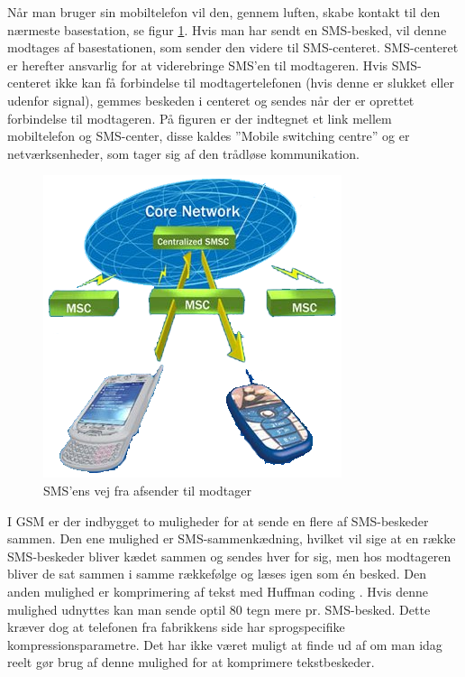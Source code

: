Når man bruger sin mobiltelefon vil den, gennem luften, skabe kontakt til den nærmeste basestation, se figur \ref{GSM}. Hvis man har sendt en SMS-besked, vil denne modtages af basestationen, som sender den videre til SMS-centeret. SMS-centeret er herefter ansvarlig for at viderebringe SMS’en til modtageren. Hvis SMS-centeret ikke kan få forbindelse til modtagertelefonen (hvis denne er slukket eller udenfor signal), gemmes beskeden i centeret og sendes når der er oprettet forbindelse til modtageren. På figuren er der indtegnet et link mellem mobiltelefon og SMS-center, disse kaldes ”Mobile switching centre” og er netværksenheder, som tager sig af den trådløse kommunikation. \cite{info}

\begin{figure}[H]
\centering
\includegraphics []{Billeder/GSMnetvaerk.png}
\caption {SMS'ens vej fra afsender til modtager \cite{info}}
\label {GSM}
\end{figure} 

I GSM er der indbygget to muligheder for at sende en flere af SMS-beskeder sammen. Den ene mulighed er SMS-sammenkædning, hvilket vil sige at en række SMS-beskeder bliver kædet sammen og sendes hver for sig, men hos modtageren bliver de sat sammen i samme rækkefølge og læses igen som én besked. Den anden mulighed er komprimering af tekst med Huffman coding \cite{UNI}. Hvis denne mulighed udnyttes kan man sende optil 80 tegn mere pr. SMS-besked. Dette kræver dog at telefonen fra fabrikkens side har sprogspecifike kompressionsparametre. Det har ikke været muligt at finde ud af om man idag reelt gør brug af denne mulighed for at komprimere tekstbeskeder. 
